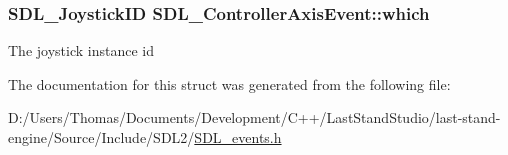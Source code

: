 \subsubsection[{which}]{\setlength{\rightskip}{0pt plus 5cm}S\+D\+L\+\_\+\+Joystick\+I\+D S\+D\+L\+\_\+\+Controller\+Axis\+Event\+::which}\label{structSDL__ControllerAxisEvent_a07087f68ea9d64b50047d65312ee7b94}
The joystick instance id 

The documentation for this struct was generated from the following file\+:\begin{DoxyCompactItemize}
\item 
D\+:/\+Users/\+Thomas/\+Documents/\+Development/\+C++/\+Last\+Stand\+Studio/last-\/stand-\/engine/\+Source/\+Include/\+S\+D\+L2/\hyperlink{SDL__events_8h}{S\+D\+L\+\_\+events.\+h}\end{DoxyCompactItemize}
